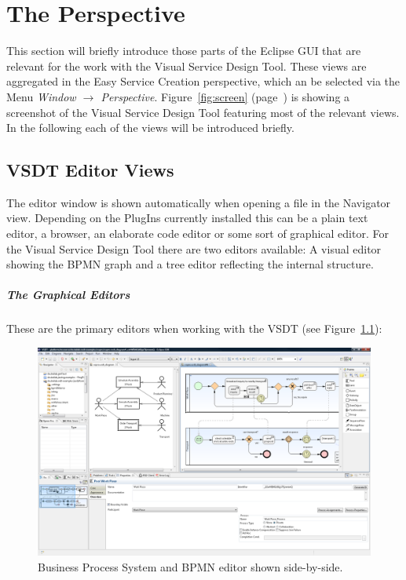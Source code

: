 \chapter{The Perspective}
\label{sec:user_perspective}

This section will briefly introduce those parts of the Eclipse GUI that are relevant for the work
with the Visual Service Design Tool. These views are aggregated in the Easy Service Creation
perspective, which an be selected via the Menu \emph{Window $\rightarrow$ Perspective}.
Figure~\ref{fig:screen} (page~\pageref{fig:screen}) is showing a screenshot of the Visual Service
Design Tool featuring most of the relevant views. In the following each of the views will be
introduced briefly.


\section{VSDT Editor Views}
\label{sec:user_perspective_editor}

The editor window is shown automatically when opening a file in the Navigator view. Depending on the
PlugIns currently installed this can be a plain text editor, a browser, an elaborate code editor or
some sort of graphical editor. For the Visual Service Design Tool there are two editors available: A
visual editor showing the BPMN graph and a tree editor reflecting the internal structure.  

\paragraph*{The Graphical Editors}
These are the primary editors when working with the VSDT (see Figure~\ref{fig:screen_meta}):

\begin{figure}
	\centering
	\includegraphics[height=.4\textheight]{figures/vsdt_1-2-0.png}
	\caption{Business Process System and BPMN editor shown side-by-side.}
	\label{fig:screen_meta}
\end{figure}

